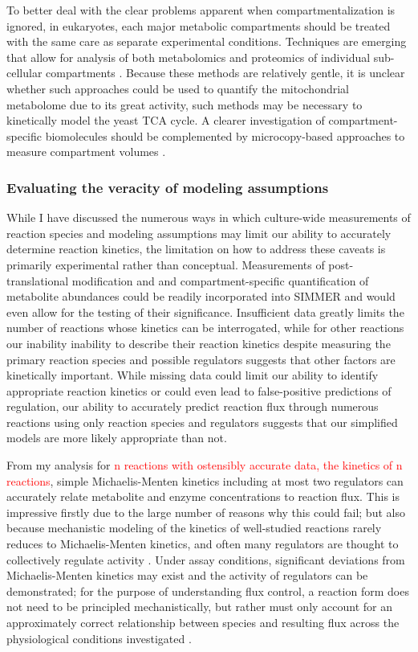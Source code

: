To better deal with the clear problems apparent when compartmentalization is ignored, in eukaryotes, each major metabolic compartments should be treated with the same care as separate experimental conditions. Techniques are emerging that allow for analysis of both metabolomics and proteomics of individual sub-cellular compartments \cite{Klie:2011kq, Wuhr:2014fr}. Because these methods are relatively gentle, it is unclear whether such approaches could be used to quantify the mitochondrial metabolome due to its great activity, such methods may be necessary to kinetically model the yeast TCA cycle. A clearer investigation of compartment-specific biomolecules should be complemented by microcopy-based approaches to measure compartment volumes \cite{JENSEN:1993bz, Ghaemmaghami:2003ds}.

\subsubsection{Evaluating the veracity of modeling assumptions}

While I have discussed the numerous ways in which culture-wide measurements of reaction species and modeling assumptions may limit our ability to accurately determine reaction kinetics, the limitation on how to address these caveats is primarily experimental rather than conceptual. Measurements of post-translational modification and and compartment-specific quantification of metabolite abundances could be readily incorporated into SIMMER and would even allow for the testing of their significance. Insufficient data greatly limits the number of reactions whose kinetics can be interrogated, while for other reactions our inability inability to describe their reaction kinetics despite measuring the primary reaction species  and possible regulators suggests that other factors are kinetically important. While missing data could limit our ability to identify appropriate reaction kinetics or could even lead to false-positive predictions of regulation, our ability to accurately predict reaction flux through numerous reactions using only reaction species and regulators suggests that our simplified models are more likely appropriate than not.

From my analysis for \textcolor{red}{n reactions with ostensibly accurate data, the kinetics of n reactions}, simple Michaelis-Menten kinetics including at most two regulators can accurately relate metabolite and enzyme concentrations to reaction flux. This is impressive firstly due to the large number of reasons why this could fail; but also because mechanistic modeling of the kinetics of well-studied reactions rarely reduces to Michaelis-Menten kinetics, and often many regulators are thought to collectively regulate activity \cite{Hill:1977vm}.  Under assay conditions, significant deviations from Michaelis-Menten kinetics may exist and the activity of regulators can be demonstrated; for the purpose of understanding flux control, a reaction form does not need to be principled mechanistically, but rather must only account for an approximately correct relationship between species and resulting flux across the physiological conditions investigated \cite{Fell:1997wg}. 

